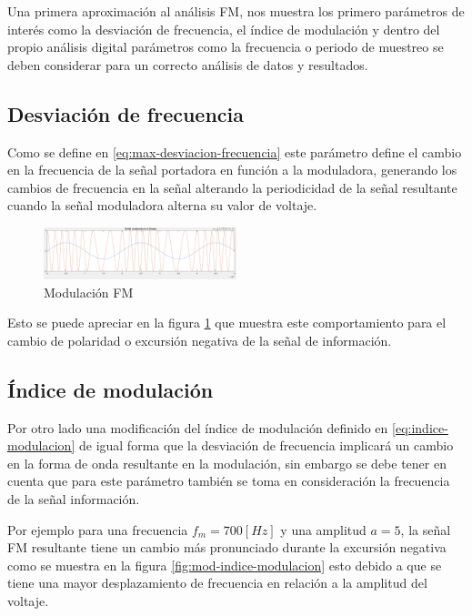 \documentclass[conference]{IEEEtran}
\begin{document}
	Una primera aproximación al análisis FM, nos muestra los primero parámetros de interés como la desviación de frecuencia, el índice de modulación y dentro del propio análisis digital parámetros como la frecuencia o periodo de muestreo se deben considerar para un correcto análisis de datos y resultados.
	
	\subsection{Desviación de frecuencia}
	Como se define en \ref{eq:max-desviacion-frecuencia} este parámetro define el cambio en la frecuencia de la señal portadora en función a la moduladora, generando los cambios de frecuencia en la señal alterando la periodicidad de la señal resultante cuando la señal moduladora alterna su valor de voltaje.
	
	\begin{figure}[h]
		\centering
		\includegraphics[width=0.5\textwidth]{media/forma-alterada-fm}
		\caption{Modulación FM}
		\label{fig:forma-alterada-fm}
	\end{figure}
	
	Esto se puede apreciar en la figura \ref{fig:forma-alterada-fm} que muestra este comportamiento para el cambio de polaridad o excursión negativa de la señal de información.
	
	\subsection{Índice de modulación}
	
	Por otro lado una modificación del índice de modulación definido en \ref{eq:indice-modulacion} de igual forma que la desviación de frecuencia implicará un cambio en la forma de onda resultante en la modulación, sin embargo se debe tener en cuenta que para este parámetro también se toma en consideración la frecuencia de la señal información.
	
	Por ejemplo para una frecuencia $f_m = 700 [Hz]$ y una amplitud $a = 5$, la señal FM resultante tiene un cambio más pronunciado durante la excursión negativa como se muestra en la figura \ref{fig:mod-indice-modulacion} esto debido a que se tiene una mayor desplazamiento de frecuencia en relación a la amplitud del voltaje.
	
\end{document}
